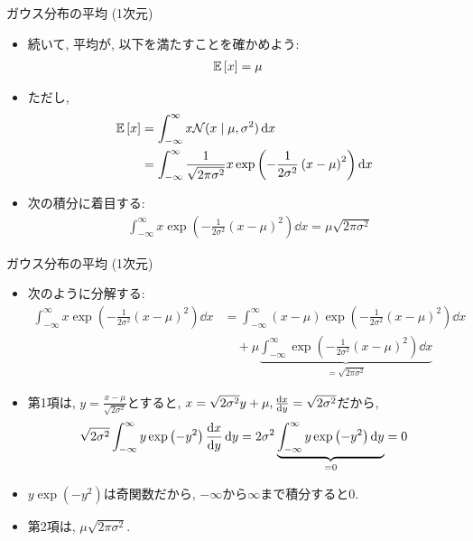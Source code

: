 \documentclass[dvipdfmx,notheorems,t]{beamer}
\begin{document}
\begin{frame}{ガウス分布の平均 (1次元)}
\begin{itemize}
  \item 続いて, 平均が, 以下を満たすことを確かめよう:
  \begin{align*}
    \operatorname{\mathbb{E}} \left[ x \right] &= \mu
  \end{align*}
  \item ただし,
  \begin{align*}
    \operatorname{\mathbb{E}} \left[ x \right] &= \int_{-\infty}^\infty x \mathcal{N}(x \mid \mu, \sigma^2) \dd{x} \\
      &= \int_{-\infty}^\infty \frac{1}{\sqrt{2 \pi \sigma^2}} x
        \exp \left( -\frac{1}{2 \sigma^2} \left( x - \mu \right)^2 \right) \dd{x}
  \end{align*}
  \item 次の積分に着目する:
  \begin{align*}
    & \int_{-\infty}^\infty x \exp
      \left( -\frac{1}{2 \sigma^2} \left( x - \mu \right)^2 \right) \dd{x}
      = \mu \sqrt{2 \pi \sigma^2}
  \end{align*}
\end{itemize}
\end{frame}

\begin{frame}{ガウス分布の平均 (1次元)}
\begin{itemize}
  \item 次のように分解する:
  {\small \begin{align*}
    \int_{-\infty}^\infty x \exp
      \left( -\frac{1}{2 \sigma^2} \left( x - \mu \right)^2 \right) \dd{x}
      &= \int_{-\infty}^\infty (x - \mu) \exp
        \left( -\frac{1}{2 \sigma^2} \left( x - \mu \right)^2 \right) \dd{x} \\
      & \quad + \mu \underbrace{\int_{-\infty}^\infty \exp
        \left( -\frac{1}{2 \sigma^2} \left( x - \mu \right)^2 \right) \dd{x}}_{= \sqrt{2 \pi \sigma^2}}
  \end{align*}}
  \item 第1項は, $y = \frac{x - \mu}{\sqrt{2 \sigma^2}}$とすると,
  $x = \sqrt{2 \sigma^2} y + \mu, \dv{x}{y} = \sqrt{2 \sigma^2}$だから,
  \begin{align*}
    \sqrt{2 \sigma^2} \int_{-\infty}^\infty y \exp \left( -y^2 \right) \dv{x}{y} \dd{y}
      = 2 \sigma^2 \underbrace{\int_{-\infty}^\infty y \exp \left( -y^2 \right) \dd{y}}_{= 0}
      = 0
  \end{align*}
  \item $y \exp \left( -y^2 \right)$は奇関数だから, $-\infty$から$\infty$まで積分すると$0$.
  \item 第2項は, $\mu \sqrt{2 \pi \sigma^2}$.
\end{itemize}
\end{frame}
\end{document}
